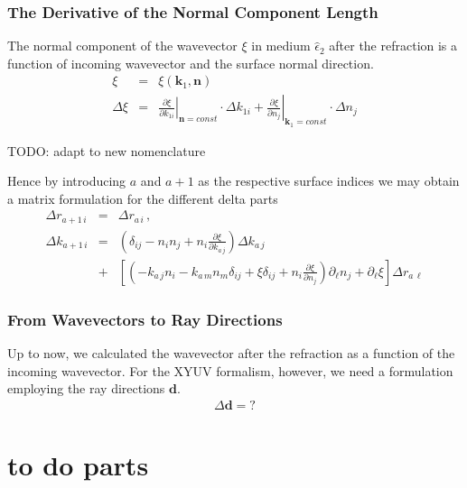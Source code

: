 \documentclass[12pt,a4paper,twoside,openright,BCOR10mm,headsepline,titlepage,abstracton,chapterprefix,final]{scrreprt}
\newcommand\Vector[1]{{\mathbf{#1}}}
\newcommand\wavenumber{k}
\newcommand\Wavevector{\Vector{\wavenumber}}
\newcommand\Tensor[1]{\hat{#1}}
\newcommand\permittivity{\Tensor{\epsilon}}
\begin{document}
\subsubsection{The Derivative of the Normal Component Length}
The normal component of the wavevector $\xi$ in medium $\permittivity_2$ after the refraction 
is a function of incoming wavevector and the surface normal direction.
\begin{eqnarray}
 \xi &=& \xi(\Wavevector_{1}, \Vector{n}) \\
 \Delta \xi &=& 
     \left.  \frac{\partial \xi}{\partial k_{1i}}  \right|_{\Vector{n}=const} \cdot \Delta k_{1i}
   + \left. \frac{\partial \xi}{\partial n_j} \right|_{\Wavevector_{1}=const} \cdot \Delta n_j
\end{eqnarray}

TODO: adapt to new nomenclature

Hence by introducing $a$ and $a+1$ as the respective surface indices we may obtain a matrix formulation for the different delta parts
\begin{eqnarray}
 \Delta r_{a+1\,i} &=& \Delta r_{a\,i}\,,\\
 \Delta \wavenumber_{a+1\,i} &=& 
   \left( \delta_{ij}  - n_i n_j + n_i \frac{\partial \xi}{\partial \wavenumber_{a\,j}}\right) \Delta\wavenumber_{a\,j} \nonumber\\
   &+&
   \left[
      \left(
     - \wavenumber_{a\,j}  n_i 
     - \wavenumber_{a\,m} n_m \delta_{ij}  
     + \xi \delta_{ij}
     + n_i \frac{\partial \xi}{\partial n_j}
    \right) \partial_\ell n_j + \partial_\ell \xi\right]\Delta r_{a\,\ell}
\end{eqnarray}

\subsubsection{From Wavevectors to Ray Directions}
Up to now, we calculated the wavevector after the refraction as a function of the incoming wavevector. 
For the XYUV formalism, however, we need a formulation employing the ray directions $\Vector{d}$.
\begin{eqnarray}
 \Delta\Vector{d} = ?
\end{eqnarray}



\section{to do parts}
\end{document}
